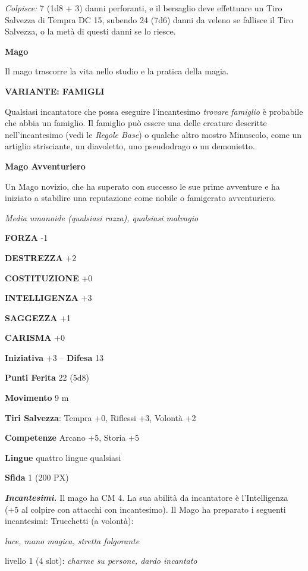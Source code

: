 \begin{multicols}{2}
	\textit{Colpisce:} 7 (1d8 + 3) danni perforanti, e il bersaglio deve effettuare un Tiro Salvezza di Tempra DC 15, subendo 24 (7d6) danni da veleno se fallisce il Tiro Salvezza, o la metà di questi danni se lo riesce.

	\medskip\textbf{Mago}

	Il mago trascorre la vita nello studio e la pratica della magia.

	\textbf{VARIANTE: FAMIGLI}

	Qualsiasi incantatore che possa eseguire l'incantesimo \textit{trovare} \textit{famiglio} è probabile che abbia un famiglio. Il famiglio può essere una delle creature descritte nell'incantesimo (vedi le \textit{Regole Base}) o qualche altro mostro Minuscolo, come un artiglio strisciante, un diavoletto, uno pseudodrago o un demonietto.

	\medskip\textbf{Mago Avventuriero}

	Un Mago novizio, che ha superato con successo le sue prime avventure e ha iniziato a stabilire una reputazione come nobile o famigerato avventuriero.

	\textit{Media umanoide (qualsiasi razza), qualsiasi malvagio}

	\textbf{FORZA} -1

	\textbf{DESTREZZA} +2

	\textbf{COSTITUZIONE} +0

	\textbf{INTELLIGENZA} +3

	\textbf{SAGGEZZA} +1

	\textbf{CARISMA} +0

	\textbf{Iniziativa} +3 -- \textbf{Difesa} 13

	\textbf{Punti Ferita} 22 (5d8)

	\textbf{Movimento} 9 m

	\textbf{Tiri Salvezza}: Tempra +0, Riflessi +3, Volontà +2

	\textbf{Competenze} Arcano +5, Storia +5

	\textbf{Lingue} quattro lingue qualsiasi

	\textbf{Sfida} 1 (200 PX)

	\textit{\textbf{Incantesimi.}} Il mago ha CM 4. La sua abilità da incantatore è l'Intelligenza (+5 al colpire con attacchi con incantesimo). Il Mago ha preparato i seguenti incantesimi: Trucchetti (a volontà):

	\textit{luce, mano magica, stretta folgorante}

	livello 1 (4 slot): \textit{charme su persone, dardo incantato}


\end{multicols}
